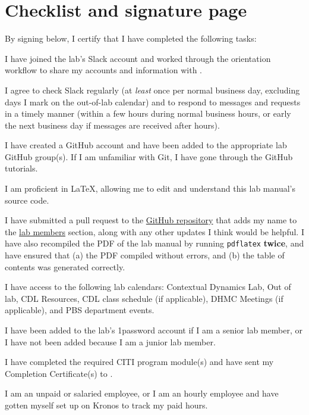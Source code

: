 \documentclass{tufte-book} %
\begin{document}
\chapter{Checklist and signature page}

   By signing below, I certify that I have completed the following tasks:
   \begin{todolist}
     \item I have joined the lab's Slack account and worked through the
    orientation workflow to share my accounts and information with \director.
    \item I agree to check Slack
    regularly (at \textit{least} once per normal business day, excluding days I
    mark on the out-of-lab calendar) and to respond to messages and
    requests in a timely manner (within a few hours during normal
    business hours, or early the next business day if messages are
    received after hours).
  \item I have created a GitHub account and have been added to the appropriate lab
    GitHub group(s).  If I am unfamiliar with Git, I have gone through
    the GitHub tutorials.
  \item I am proficient in \LaTeX, allowing me to edit and understand
  this lab manual's source code.
\item I have submitted a pull request to the
  \href{https://github.com/ContextLab/lab-manual}{GitHub repository}
  that adds my name to the \hyperref[sec:curr_members]{lab members}
  section, along with any other updates I think would be helpful.  I
  have also recompiled the PDF of the lab manual by running
  \texttt{pdflatex} \textbf{twice}, and have ensured that (a) the PDF compiled
  without errors, and (b) the table of contents was generated correctly.
  \item I have access to the following lab calendars:
    Contextual Dynamics Lab, Out of lab, CDL Resources, CDL class
    schedule (if applicable), DHMC Meetings (if
    applicable), and PBS department events.
  \item I have been added to the lab's 1password account if I am a
    senior lab member, or I have not been added because I am a junior
    lab member.
  \item I have completed the required CITI program module(s) and have
    sent my Completion Certificate(s) to \coordinator.
  \item I am an unpaid or salaried employee, or I am an hourly
    employee and have gotten myself set up on Kronos to track my paid
    hours.

\end{todolist}
\end{document}
